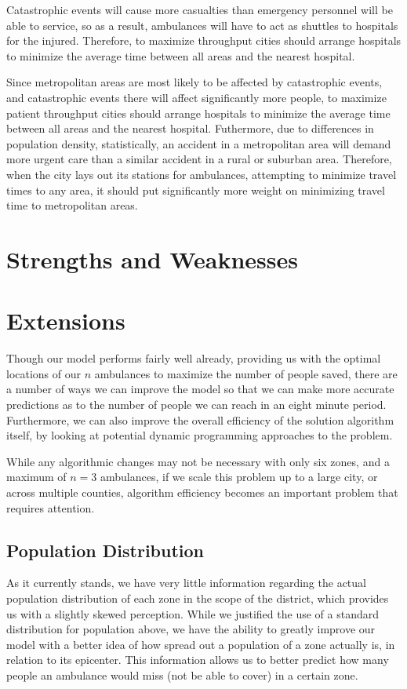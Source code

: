 \documentclass[notitlepage, 12pt]{article}
\begin{document}
Catastrophic events will cause more casualties than emergency personnel will be able to service, so as a result,
ambulances will have to act as shuttles to hospitals for the injured. Therefore, to maximize throughput
cities should arrange hospitals to minimize the average time between all areas and the nearest
hospital.

Since metropolitan areas are most likely to be affected by catastrophic events, and catastrophic events there
will affect significantly more people, to maximize patient throughput cities should arrange hospitals to minimize
the average time between all areas and the nearest hospital. Futhermore, due to differences in population density,
statistically, an accident in a metropolitan area will demand more urgent care than a similar accident
in a rural or suburban area. Therefore, when the city lays out its stations for ambulances, attempting to minimize
travel times to any area, it should put significantly more weight on minimizing travel time to metropolitan areas.

\section{Strengths and Weaknesses}

\section{Extensions}
Though our model performs fairly well already, providing us with the optimal locations of our $n$ ambulances to maximize the number of people saved, there are a number of ways we can improve the model so that we can make more accurate predictions as to the number of people we can reach in an eight minute period. Furthermore, we can also improve the overall efficiency of the solution algorithm itself, by looking at potential dynamic programming approaches to the problem. 

While any algorithmic changes may not be necessary with only six zones, and a maximum of $n = 3$ ambulances, if we scale this problem up to a large city, or across multiple counties, algorithm efficiency becomes an important problem that requires attention.

\subsection{Population Distribution}
As it currently stands, we have very little information regarding the actual population distribution of each zone in the scope of the district, which provides us with a slightly skewed perception. While we justified the use of a standard distribution for population above, we have the ability to greatly improve our model with a better idea of how spread out a population of a zone actually is, in relation to its epicenter. This information allows us to better predict how many people an ambulance would miss (not be able to cover) in a certain zone.
\end{document}
